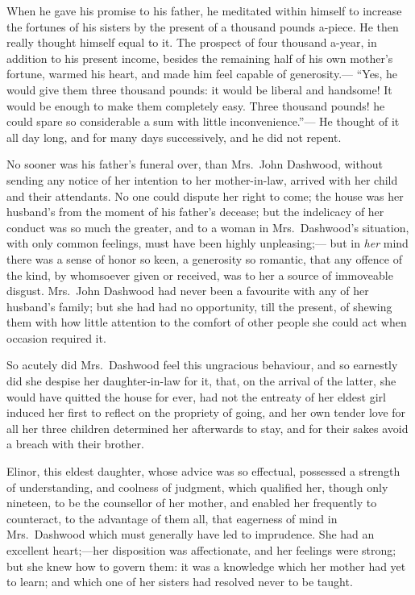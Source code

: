 \documentclass{article}
\begin{document}
When he gave his promise to his father, he meditated
within himself to increase the fortunes of his sisters
by the present of a thousand pounds a-piece.  He then
really thought himself equal to it.  The prospect of four
thousand a-year, in addition to his present income,
besides the remaining half of his own mother's fortune,
warmed his heart, and made him feel capable of generosity.---%
``Yes, he would give them three thousand pounds: it would
be liberal and handsome! It would be enough to make
them completely easy.  Three thousand pounds! he could
spare so considerable a sum with little inconvenience.''---%
He thought of it all day long, and for many days successively,
and he did not repent.

No sooner was his father's funeral over, than Mrs.\ John
Dashwood, without sending any notice of her intention to her
mother-in-law, arrived with her child and their attendants.
No one could dispute her right to come; the house was
her husband's from the moment of his father's decease;
but the indelicacy of her conduct was so much the greater,
and to a woman in Mrs.\ Dashwood's situation, with only
common feelings, must have been highly unpleasing;---%
but in \emph{her} mind there was a sense of honor so keen,
a generosity so romantic, that any offence of the kind,
by whomsoever given or received, was to her a source
of immoveable disgust.  Mrs.\ John Dashwood had never
been a favourite with any of her husband's family;
but she had had no opportunity, till the present,
of shewing them with how little attention to the comfort
of other people she could act when occasion required it.

So acutely did Mrs.\ Dashwood feel this ungracious
behaviour, and so earnestly did she despise her
daughter-in-law for it, that, on the arrival of the latter,
she would have quitted the house for ever, had not the
entreaty of her eldest girl induced her first to reflect
on the propriety of going, and her own tender love for all
her three children determined her afterwards to stay,
and for their sakes avoid a breach with their brother.

Elinor, this eldest daughter, whose advice was
so effectual, possessed a strength of understanding,
and coolness of judgment, which qualified her,
though only nineteen, to be the counsellor of her mother,
and enabled her frequently to counteract, to the advantage
of them all, that eagerness of mind in Mrs.\ Dashwood
which must generally have led to imprudence.  She had
an excellent heart;---her disposition was affectionate,
and her feelings were strong; but she knew how to govern
them: it was a knowledge which her mother had yet to learn;
and which one of her sisters had resolved never to be taught.
\end{document}
